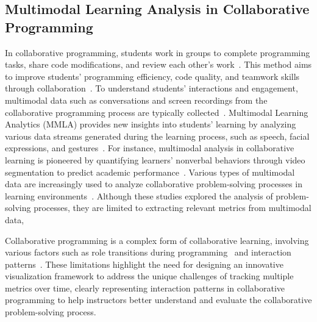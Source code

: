 \subsection{Multimodal Learning Analysis in Collaborative Programming}
In collaborative programming, students work in groups to complete programming tasks, share code modifications, and review each other's work~\cite{maguire2014enhancing,hou2024automated}. 
This method aims to improve students' programming efficiency, code quality, and teamwork skills through collaboration~\cite{hanks2011pair,diana2017instructor}. 
To understand students' interactions and engagement, multimodal data such as conversations and screen recordings from the collaborative programming process are typically collected~\cite{mangaroska2022exploring,wang2024unveiling}.
Multimodal Learning Analytics (MMLA) provides new insights into students' learning by analyzing various data streams generated during the learning process, such as speech, facial expressions, and gestures~\cite{yan2024evidence,chejara2024bringing}. 
For instance, multimodal analysis in collaborative learning is pioneered by quantifying learners' nonverbal behaviors through video segmentation to predict academic performance~\cite{ambady1993half}.
Various types of multimodal data are increasingly used to analyze collaborative problem-solving processes in learning environments~\cite{zhang2022towards,ma2022detecting}. 
Although these studies explored the analysis of problem-solving processes, they are limited to extracting relevant metrics from multimodal data, 

Collaborative programming is a complex form of collaborative learning, involving various factors such as role transitions during programming~\cite{lewis2011pair} and interaction patterns~\cite{zhou2024understanding}. 
These limitations highlight the need for designing an innovative visualization framework to address the unique challenges of tracking multiple metrics over time, clearly representing interaction patterns in collaborative programming to help instructors better understand and evaluate the collaborative problem-solving process.

